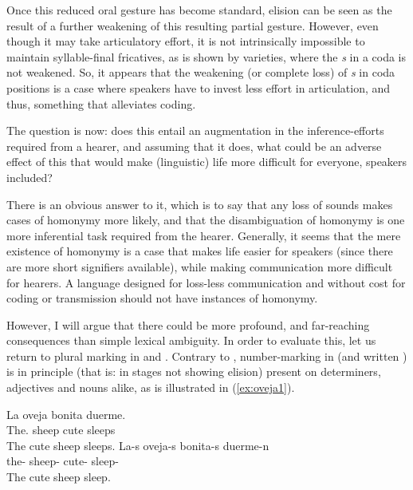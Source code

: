 \documentclass[output=paper,hidelinks]{langscibook}
\begin{document}
Once this reduced oral gesture has become standard, elision can be seen as the result of a further weakening of this resulting partial gesture. However, even though it may take articulatory effort, it is not intrinsically impossible to maintain syllable-final fricatives, as is shown by  varieties, where the \emph{s} in a coda is not weakened. So, it appears that the weakening (or complete loss) of \emph{s} in coda positions is a case where speakers have to invest less effort in articulation, and thus, something that alleviates coding.

The question is now: does this entail an augmentation in the inference-efforts required from a hearer, and assuming that it does, what could be an adverse effect of this that would make (linguistic) life more difficult for everyone, speakers included?

There is an obvious answer to it, which is to say that any loss of sounds makes cases of homonymy more likely, and that the disambiguation of homonymy is one more inferential task required from the hearer. Generally, it seems that the mere existence of homonymy is a case that makes life easier for speakers (since there are more short signifiers available), while making communication more difficult for hearers. A language designed for loss-less communication and without cost for coding or transmission should not have instances of homonymy.

However, I will argue that there could be more profound, and far-reaching consequences than simple lexical ambiguity. In order to evaluate this, let us return to plural marking in  and . Contrary to , number-marking in  (and written ) is in principle (that is: in stages not showing elision) present on determiners, adjectives and nouns alike, as is illustrated in (\ref{ex:oveja1}).

\begin{exe}
  \ex \label{ex:oveja1}
  \begin{xlist}
    \ex
    \gll La oveja bonita duerme.\\
    The.\SG{} sheep cute sleeps\\
    \glt The cute sheep sleeps.
    \ex
    \gll La-s oveja-s bonita-s duerme-n\\
    the-\PL{} sheep-\PL{} cute-\PL{} sleep-\PL{}\\
    \glt The cute sheep sleep.
  \end{xlist}
\end{exe}
\end{document}
